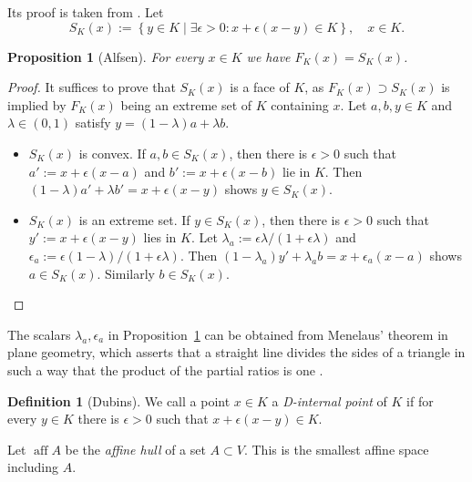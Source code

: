 \documentclass[a4paper,11pt,reqno]{amsart}
\numberwithin{equation}{section}
\theoremstyle{plain}
\newtheorem{proposition}[theorem]{Proposition}
\theoremstyle{definition}
\newtheorem{definition}[theorem]{Definition}
\DeclareMathOperator\aff{aff} %
\begin{document}
Its proof is taken from \cite[Proposition~4.1]{weis25}. Let
\[
S_K(x):=\left\{ y\in K \mid \exists\epsilon>0\colon x+\epsilon(x-y)\in K \right\},
\quad x\in K.
\]
\par
%
\begin{proposition}[Alfsen]\label{pro:Alfsen}
For every $x\in K$ we have $F_K(x)=S_K(x)$.
\end{proposition}
%
\begin{proof}
It suffices to prove that $S_K(x)$ is a face of $K$, as $F_K(x)\supset S_K(x)$ 
is implied by $F_K(x)$ being an extreme set of $K$ containing $x$. Let 
$a,b,y\in K$ and $\lambda\in(0,1)$ satisfy $y=(1-\lambda)a+\lambda b$.
\par
%
\begin{itemize}
\item 
$S_K(x)$ is convex. If $a,b\in S_K(x)$, then there is $\epsilon>0$ such that 
$a':=x+\epsilon(x-a)$ and $b':=x+\epsilon(x-b)$ lie in $K$. Then 
$(1-\lambda)a'+\lambda b'=x+\epsilon(x-y)$ shows $y\in S_K(x)$.
%
\item
$S_K(x)$ is an extreme set. If $y\in S_K(x)$, then there is $\epsilon>0$ 
such that $y':=x+\epsilon(x-y)$ lies in $K$. Let
$\lambda_a:=\epsilon \lambda/(1+\epsilon \lambda)$ and 
$\epsilon_a:=\epsilon(1-\lambda)/(1+\epsilon \lambda)$. Then 
$(1-\lambda_a)y'+\lambda_a b=x+\epsilon_a(x-a)$ shows $a\in S_K(x)$. 
Similarly $b\in S_K(x)$. 
\qedhere
\end{itemize}
\end{proof}
%
The scalars $\lambda_a,\epsilon_a$ in Proposition~\ref{pro:Alfsen} can be 
obtained from Menelaus' theorem in plane geometry, which asserts that a 
straight line divides the sides of a triangle in such a way that the 
product of the partial ratios is one \cite{gruenbaum-shephard95}.
\par
%
\begin{definition}[Dubins]\label{def:internal-point}
We call a point $x\in K$ a \emph{D-internal point} of $K$ if for every $y\in K$ 
there is $\epsilon>0$ such that $x+\epsilon(x-y)\in K$. 
\end{definition}
%
Let $\aff A$ be the \emph{affine hull} of a set $A\subset V$. This is the smallest 
affine space including $A$.
\par
%
\end{document}
